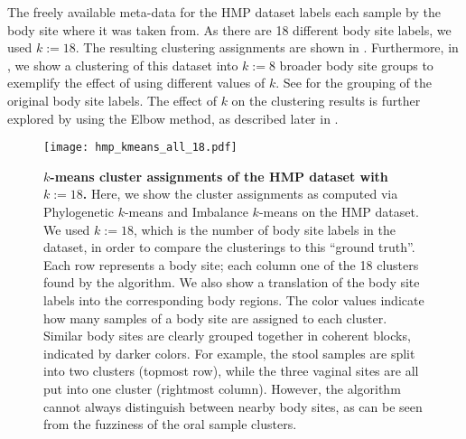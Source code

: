 The freely available meta-data for the \ac{HMP} dataset labels each sample by the body site where it was taken from.
As there are \num{18} different body site labels, we used $k:=18$.
The resulting clustering assignments are shown in .
Furthermore, in ,
we show a clustering of this dataset into $k:=8$ broader body site groups
to exemplify the effect of using different values of $k$.
See  for the grouping of the original body site labels.
The effect of $k$ on the clustering results is further explored by using the Elbow method,
as described later in .

\begin{figure}[hpbt]
    \centering
    \texttt{[image: hmp\_kmeans\_all\_18.pdf]}
    \begin{subfigure}{0pt}
        \label{fig:hmp_kmeans_all_18:sub:em_unconstr}
    \end{subfigure}
    \begin{subfigure}{0pt}
        \label{fig:hmp_kmeans_all_18:sub:ei_unconstr}
    \end{subfigure}
    \caption[$k$-means cluster assignments of the \acs{HMP} dataset with $k:=18$]{
        \textbf{$k$-means cluster assignments of the \acs{HMP} dataset with $k:=18$.}
        Here, we show the cluster assignments as computed via
         Phylogenetic $k$-means and
         Imbalance $k$-means on the \ac{HMP} dataset.
        We used $k:=18$, which is the number of body site labels in the dataset,
        in order to compare the clusterings to this ``ground truth''.
        Each row represents a body site; each column one of the 18 clusters found by the algorithm.
        We also show a translation of the body site labels into the corresponding body regions.
        The color values indicate how many samples of a body site are assigned to each cluster.
        Similar body sites are clearly grouped together in coherent blocks, indicated by darker colors.
        For example, the stool samples are split into two clusters (topmost row),
        while the three vaginal sites are all put into one cluster (rightmost column).
        However, the algorithm cannot always distinguish between nearby body sites,
        as can be seen from the fuzziness of the oral sample clusters.
    }
    \label{fig:hmp_kmeans_all_18}
\end{figure}

